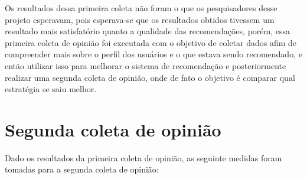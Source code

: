 Os resultados dessa primeira coleta não foram o que os pesquisadores desse
projeto esperavam, pois esperava-se que os resultados obtidos tivessem um
resultado mais satisfatório quanto a qualidade das recomendações, porém, essa
primeira coleta de opinião foi executada com o objetivo de coletar dados afim de
compreender mais sobre o perfil dos usuários e o que estava sendo recomendado,
e então utilizar isso para melhorar o sistema de recomendação e posteriormente
realizar uma segunda coleta de opinião, onde de fato o objetivo é comparar qual
estratégia se saiu melhor.

\section{Segunda coleta de opinião}

Dado os resultados da primeira coleta de opinião, as seguinte medidas foram tomadas
para a segunda coleta de opinião:

